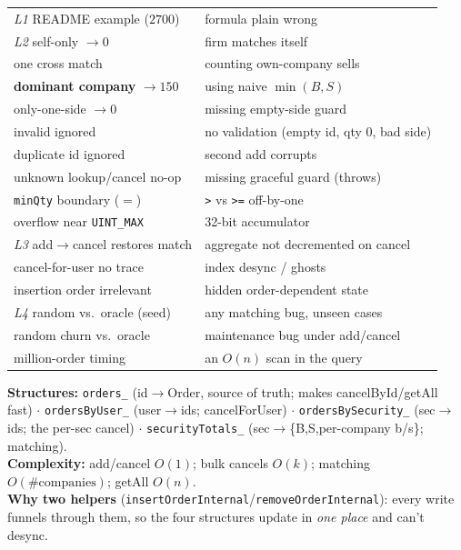 \documentclass[10pt]{article}
\newcommand{\code}[1]{\texttt{#1}}
\begin{document}
\vspace{1.5mm}
\begin{tcolorbox}[colback=Soft,colframe=Sell,title={\bfseries Drill B answers --- test / bug it traps},fonttitle=\bfseries\color{white},coltitle=white,colbacktitle=Sell]
\footnotesize
\begin{tabular}{@{}p{4.9cm}p{11.4cm}@{}}
\textit{\color{Accent}L1} README example ($2700$) & formula plain wrong \\
\textit{\color{Accent}L2} self-only $\to0$ & firm matches itself \\
\quad one cross match & counting own-company sells \\
\quad \textbf{dominant company} $\to150$ & using naive $\min(B,S)$ \\
\quad only-one-side $\to0$ & missing empty-side guard \\
\quad invalid ignored & no validation (empty id, qty 0, bad side) \\
\quad duplicate id ignored & second add corrupts \\
\quad unknown lookup/cancel no-op & missing graceful guard (throws) \\
\quad \code{minQty} boundary ($=$) & \code{>} vs \code{>=} off-by-one \\
\quad overflow near \code{UINT\_MAX} & 32-bit accumulator \\
\textit{\color{Accent}L3} add$\to$cancel restores match & aggregate not decremented on cancel \\
\quad cancel-for-user no trace & index desync / ghosts \\
\quad insertion order irrelevant & hidden order-dependent state \\
\textit{\color{Accent}L4} random vs.\ oracle (seed) & any matching bug, unseen cases \\
\quad random churn vs.\ oracle & maintenance bug under add/cancel \\
\quad million-order timing & an $O(n)$ scan in the query \\
\end{tabular}
\end{tcolorbox}

\vspace{1.5mm}
\begin{tcolorbox}[colback=Soft,colframe=NavyBlue,title={\bfseries Drill C answers},fonttitle=\bfseries\color{white},coltitle=white,colbacktitle=NavyBlue]
\footnotesize
\textbf{Structures:} \code{orders\_} (id$\to$Order, source of truth; makes cancelById/getAll fast) $\cdot$ \code{ordersByUser\_} (user$\to$ids; cancelForUser) $\cdot$ \code{ordersBySecurity\_} (sec$\to$ids; the per-sec cancel) $\cdot$ \code{securityTotals\_} (sec$\to$\{B,S,per-company b/s\}; matching).\\[3pt]
\textbf{Complexity:} add/cancel $O(1)$; bulk cancels $O(k)$; matching $O(\#\text{companies})$; getAll $O(n)$.\\[3pt]
\textbf{Why two helpers} (\code{insertOrderInternal}/\code{removeOrderInternal}): every write funnels through them, so the four structures update in \emph{one place} and can't desync.
\end{tcolorbox}
\end{document}
